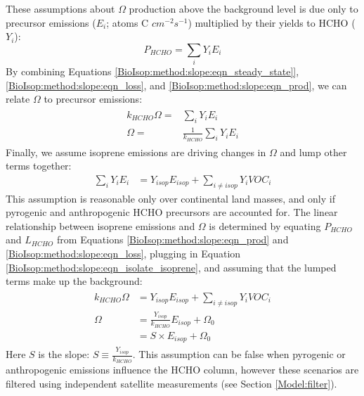     These assumptions about $\Omega$ production above the background level is due only to precursor emissions ($E_i$; atoms C $cm^{-2} s^{-1}$) multiplied by their yields to HCHO ($Y_i$):
    \begin{equation}
      \label{BioIsop:method:slope:eqn_prod}
      P_{HCHO}  = \sum_i Y_i E_i 
    \end{equation}
    By combining Equations \ref{BioIsop:method:slope:eqn_steady_state]}, \ref{BioIsop:method:slope:eqn_loss}, and \ref{BioIsop:method:slope:eqn_prod}, we can relate $\Omega$ to precursor emissions:
    \begin{eqnarray} \begin{split}
      k_{HCHO} \Omega = & \sum_i Y_i E_i \\
      \Omega = & \frac{1}{k_{HCHO}} \sum_i Y_i E_i
    \end{split} \end{eqnarray}
    Finally, we assume isoprene emissions are driving changes in $\Omega$ \parencite[as assumed elsewhere, e.g.][]{Palmer2003,Millet2008,Marais2014,Stavrakou2015} and lump other terms together:
    \begin{eqnarray}
      \label{BioIsop:method:slope:eqn_isolate_isoprene}
      \sum_i Y_i E_i  & = Y_{isop} E_{isop} + \sum_{i \ne isop} Y_{i} VOC_{i} 
    \end{eqnarray}
    This assumption is reasonable only over continental land masses, and only if pyrogenic and anthropogenic HCHO precursors are accounted for.
    The linear relationship between isoprene emissions and $\Omega$ is determined by equating $P_{HCHO}$ and $L_{HCHO}$ from Equations \ref{BioIsop:method:slope:eqn_prod} and \ref{BioIsop:method:slope:eqn_loss}, plugging in Equation \ref{BioIsop:method:slope:eqn_isolate_isoprene}, and assuming that the lumped terms make up the background:
    \begin{eqnarray} 
      \label{BioIsop:method:slope:eqn_isop_to_hcho}
      \begin{split}
        k_{HCHO}\Omega 
        & = Y_{isop} E_{isop} + \sum_{i \ne isop} Y_{i} VOC_{i} \\
        \Omega 
        & = \frac{Y_{isop}}{k_{HCHO}} E_{isop} + \Omega_0 \\
        & = S \times E_{isop} + \Omega_0
      \end{split} 
    \end{eqnarray}
    Here $S$ is the slope: $S \equiv \frac{Y_{isop}}{k_{HCHO}}$.
    This assumption can be false when pyrogenic or anthropogenic emissions influence the HCHO column, however these scenarios are filtered using independent satellite measurements (see Section \ref{Model:filter}).
    
